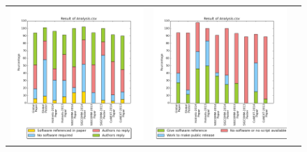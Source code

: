 \documentclass[a4paper]{SIGCOMM}
\begin{document}
\begin{figure}[!t]
    \centering
    \begin{tabular}{p{}p{}p{}}
    \href{http://nhoutain.github.io/Reproducibility/}
        {\includegraphics[width=0.7\columnwidth]{stat/bar_mail/bar_mail-all.png}} &

    \href{http://nhoutain.github.io/Reproducibility/}
        {\includegraphics[width=0.7\columnwidth]{stat/bar_mail/bar_mail2-all.png}} &


\end{tabular}
\end{figure}
\end{document}
